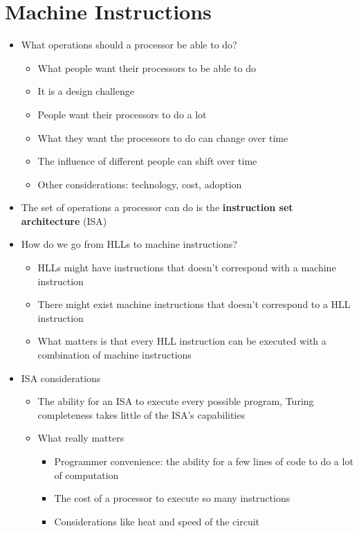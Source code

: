 \documentclass{article}
\begin{document}
\section{Machine Instructions}
\begin{itemize}
	\item What operations should a processor be able to do?
		\begin{itemize}
			\item What people want their processors to be able to do
			\item It is a design challenge
			\item People want their processors to do a lot
			\item What they want the processors to do can change over time
			\item The influence of different people can shift over time
			\item Other considerations: technology, cost, adoption
		\end{itemize}
	\item The set of operations a processor can do is the \textbf{instruction set architecture} (ISA)
	\item How do we go from HLLs to machine instructions?
		\begin{itemize}
			\item HLLs might have instructions that doesn't correspond with a machine instruction
			\item There might exist machine instructions that doesn't correspond to a HLL instruction
			\item What matters is that every HLL instruction can be executed with a combination of machine instructions
		\end{itemize}
	\item ISA considerations
		\begin{itemize}
			\item The ability for an ISA to execute every possible program, Turing completeness takes little of the ISA's capabilities
			\item What really matters
				\begin{itemize}
					\item Programmer convenience: the ability for a few lines of code to do a lot of computation
					\item The cost of a processor to execute so many instructions
					\item Considerations like heat and speed of the circuit
				\end{itemize}

\end{itemize}
\end{itemize}
\end{document}
